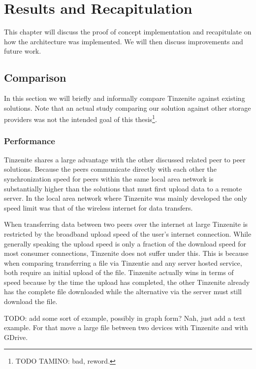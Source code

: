 \chapter{Results and Recapitulation}
\label{chap:Results and Recapitulation}

This chapter will discuss the proof of concept implementation and recapitulate on how the architecture was implemented.
We will then discuss improvements and future work.

\section{Comparison}

In this section we will briefly and informally compare Tinzenite against existing solutions.
Note that an actual study comparing our solution against other storage providers was not the intended goal of this thesis\footnote{TODO TAMINO: bad, reword.}.

\subsection{Performance}
\label{sub:Performance}

Tinzenite shares a large advantage with the other discussed related peer to peer solutions.
Because the peers communicate directly with each other the synchronization speed for peers within the same local area network is substantially higher than the solutions that must first upload data to a remote server.
In the local area network where Tinzenite was mainly developed the only speed limit was that of the wireless internet for data transfers.

When transferring data between two peers over the internet at large Tinzenite is restricted by the broadband upload speed of the user's internet connection.
While generally speaking the upload speed is only a fraction of the download speed for most consumer connections, Tinzenite does not suffer under this.
This is because when comparing transferring a file via Tinzentie and any server hosted service, both require an initial upload of the file.
Tinzenite actually wins in terms of speed because by the time the upload has completed, the other Tinzenite already has the complete file downloaded while the alternative via the server must still download the file.

TODO: add some sort of example, possibly in graph form?
Nah, just add a text example.
For that move a large file between two devices with Tinzenite and with GDrive.

